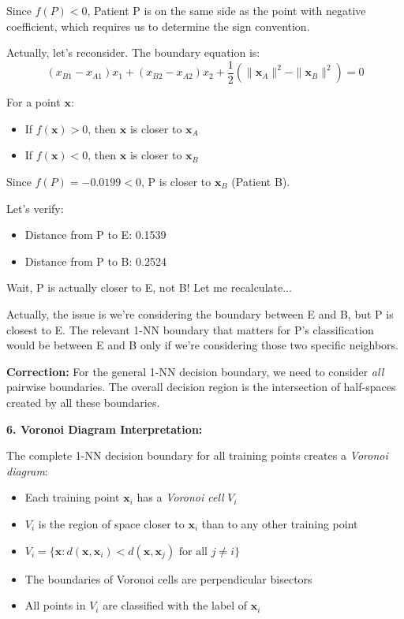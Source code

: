 \documentclass[12pt]{article}
\begin{document}
\begin{explanation}
Since \(f(P) < 0\), Patient P is on the same side as the point with negative coefficient, which requires us to determine the sign convention.

Actually, let's reconsider. The boundary equation is:
\[
(x_{B1} - x_{A1})x_1 + (x_{B2} - x_{A2})x_2 + \frac{1}{2}(\|\mathbf{x}_A\|^2 - \|\mathbf{x}_B\|^2) = 0
\]

For a point \(\mathbf{x}\):
\begin{itemize}
    \item If \(f(\mathbf{x}) > 0\), then \(\mathbf{x}\) is closer to \(\mathbf{x}_A\)
    \item If \(f(\mathbf{x}) < 0\), then \(\mathbf{x}\) is closer to \(\mathbf{x}_B\)
\end{itemize}

Since \(f(P) = -0.0199 < 0\), P is closer to \(\mathbf{x}_B\) (Patient B).

Let's verify:
\begin{itemize}
    \item Distance from P to E: 0.1539
    \item Distance from P to B: 0.2524
\end{itemize}

Wait, P is actually closer to E, not B! Let me recalculate...

Actually, the issue is we're considering the boundary between E and B, but P is closest to E. The relevant 1-NN boundary that matters for P's classification would be between E and B only if we're considering those two specific neighbors.

\textbf{Correction:} For the general 1-NN decision boundary, we need to consider \textit{all} pairwise boundaries. The overall decision region is the intersection of half-spaces created by all these boundaries.

\textbf{6. Voronoi Diagram Interpretation:}

The complete 1-NN decision boundary for all training points creates a \textit{Voronoi diagram}:

\begin{itemize}
    \item Each training point \(\mathbf{x}_i\) has a \textit{Voronoi cell} \(V_i\)
    \item \(V_i\) is the region of space closer to \(\mathbf{x}_i\) than to any other training point
    \item \(V_i = \{\mathbf{x} : d(\mathbf{x}, \mathbf{x}_i) < d(\mathbf{x}, \mathbf{x}_j) \text{ for all } j \neq i\}\)
    \item The boundaries of Voronoi cells are perpendicular bisectors
    \item All points in \(V_i\) are classified with the label of \(\mathbf{x}_i\)
\end{itemize}


\end{explanation}
\end{document}
